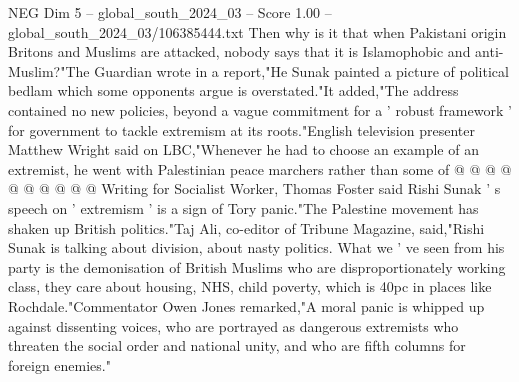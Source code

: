 \begin{textsample}{NEG Dim 5 – global\_south\_2024\_03 – Score 1.00 – global\_south\_2024\_03/106385444.txt}
Then why is it that when Pakistani origin Britons and Muslims are attacked, nobody says that it is Islamophobic and anti-Muslim?"The Guardian wrote in a report,"He Sunak painted a picture of political bedlam which some opponents argue is overstated."It added,"The address contained no new policies, beyond a vague commitment for a ' robust framework ' for government to tackle extremism at its roots."English television presenter Matthew Wright said on LBC,"Whenever he had to choose an example of an extremist, he went with Palestinian peace marchers rather than some of @ @ @ @ @ @ @ @ @ @ Writing for Socialist Worker, Thomas Foster said Rishi Sunak ' s speech on ' extremism ' is a sign of Tory panic."The Palestine movement has shaken up British politics."Taj Ali, co-editor of Tribune Magazine, said,"Rishi Sunak is talking about division, about nasty politics.
What we ' ve seen from his party is the demonisation of British Muslims who are disproportionately working class, they care about housing, NHS, child poverty, which is 40pc in places like Rochdale."Commentator Owen Jones remarked,"A moral panic is whipped up against dissenting voices, who are portrayed as dangerous extremists who threaten the social order and national unity, and who are fifth columns for foreign enemies."

\end{textsample}
